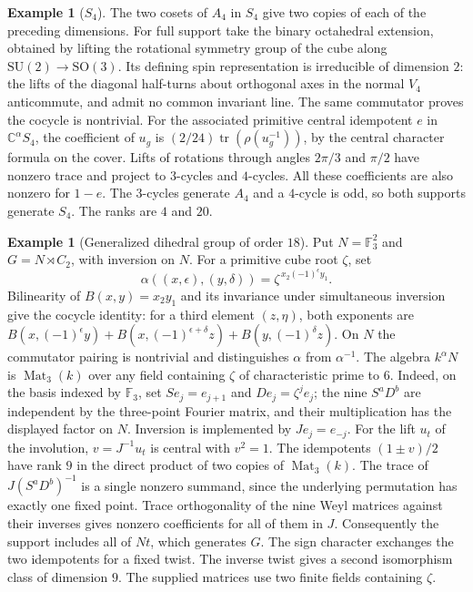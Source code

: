 \documentclass[11pt]{amsart}
\theoremstyle{definition}
\newtheorem{example}[lemma]{Example}
\newcommand{\F}{\mathbb F}
\newcommand{\C}{\mathbb C}
\DeclareMathOperator{\Mat}{Mat}
\begin{document}
\begin{example}[$S_4$]
The two cosets of $A_4$ in $S_4$ give two copies of each of the preceding dimensions. For full support take the binary octahedral extension, obtained by lifting the rotational symmetry group of the cube along $\mathrm{SU}(2)\to\mathrm{SO}(3)$. Its defining spin representation is irreducible of dimension $2$: the lifts of the diagonal half-turns about orthogonal axes in the normal $V_4$ anticommute, and admit no common invariant line. The same commutator proves the cocycle is nontrivial. For the associated primitive central idempotent $e$ in $\C^\alpha S_4$, the coefficient of $u_g$ is $(2/24)\operatorname{tr}(\rho(u_g^{-1}))$, by the central character formula on the cover. Lifts of rotations through angles $2\pi/3$ and $\pi/2$ have nonzero trace and project to $3$-cycles and $4$-cycles. All these coefficients are also nonzero for $1-e$. The $3$-cycles generate $A_4$ and a $4$-cycle is odd, so both supports generate $S_4$. The ranks are $4$ and $20$.
\end{example}

\begin{example}[Generalized dihedral group of order $18$]
Put $N=\F_3^2$ and $G=N\rtimes C_2$, with inversion on $N$. For a primitive cube root $\zeta$, set
\[
 \alpha((x,\epsilon),(y,\delta))=\zeta^{\,x_2(-1)^\epsilon y_1}.
\]
Bilinearity of $B(x,y)=x_2y_1$ and its invariance under simultaneous inversion give the cocycle identity: for a third element $(z,\eta)$, both exponents are $B(x,(-1)^\epsilon y)+B(x,(-1)^{\epsilon+\delta}z)+B(y,(-1)^\delta z)$. On $N$ the commutator pairing is nontrivial and distinguishes $\alpha$ from $\alpha^{-1}$. The algebra $k^\alpha N$ is $\Mat_3(k)$ over any field containing $\zeta$ of characteristic prime to $6$. Indeed, on the basis indexed by $\F_3$, set $S e_j=e_{j+1}$ and $D e_j=\zeta^j e_j$; the nine $S^aD^b$ are independent by the three-point Fourier matrix, and their multiplication has the displayed factor on $N$. Inversion is implemented by $J e_j=e_{-j}$. For the lift $u_t$ of the involution, $v=J^{-1}u_t$ is central with $v^2=1$. The idempotents $(1\pm v)/2$ have rank $9$ in the direct product of two copies of $\Mat_3(k)$. The trace of $J(S^aD^b)^{-1}$ is a single nonzero summand, since the underlying permutation has exactly one fixed point. Trace orthogonality of the nine Weyl matrices against their inverses gives nonzero coefficients for all of them in $J$. Consequently the support includes all of $Nt$, which generates $G$. The sign character exchanges the two idempotents for a fixed twist. The inverse twist gives a second isomorphism class of dimension $9$. The supplied matrices use two finite fields containing $\zeta$.
\end{example}
\end{document}
